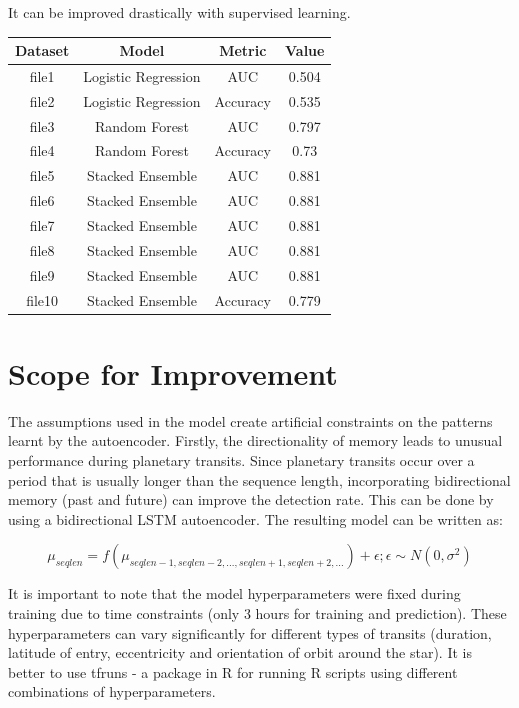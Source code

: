 \documentclass[%
aip,
amsmath,amssymb,
reprint,%
]{revtex4-1}
\begin{document}
It can be improved drastically with supervised learning.

\begin{center}
 \begin{tabular}{|c | c | c | c |} 
 \hline
 \textbf{Dataset} & \textbf{Model}& \textbf{Metric} & \textbf{Value} \\ [0.5 ex]
 \hline
 file1 & Logistic Regression & AUC & 0.504 \\ 
 \hline
 file2 & Logistic Regression & Accuracy & 0.535 \\
 \hline
 file3 & Random Forest & AUC & 0.797 \\
 \hline
 file4 & Random Forest & Accuracy & 0.73 \\
 \hline
 file5 & Stacked Ensemble & AUC & 0.881 \\
 \hline
 file6 & Stacked Ensemble & AUC & 0.881 \\
 \hline
 file7 & Stacked Ensemble & AUC & 0.881 \\
 \hline
 file8 & Stacked Ensemble & AUC & 0.881 \\
 \hline
 file9 & Stacked Ensemble & AUC & 0.881 \\
 \hline
 file10 & Stacked Ensemble & Accuracy & 0.779 \\ [1ex] 
 \hline
\end{tabular}
\end{center}

\section{Scope for Improvement}

The assumptions used in the model create artificial constraints on the patterns learnt by the autoencoder. Firstly, the directionality of memory leads to unusual performance during planetary transits. Since planetary transits occur over a period that is usually longer than the sequence length, incorporating bidirectional memory (past and future) can improve the detection rate. This can be done by using a bidirectional LSTM autoencoder. The resulting model can be written as:

$$\mu_{seqlen} = f(\mu_{seqlen-1,seqlen-2, ..., seqlen+1, seqlen+2, ...}) + \epsilon; \epsilon \sim N(0, \sigma^2)$$

It is important to note that the model hyperparameters were fixed during training due to time constraints (only 3 hours for training and prediction). These hyperparameters can vary significantly for different types of transits (duration, latitude of entry, eccentricity and orientation of orbit around the star). It is better to use tfruns - a package in R for running R scripts using different combinations of hyperparameters.
\end{document}
